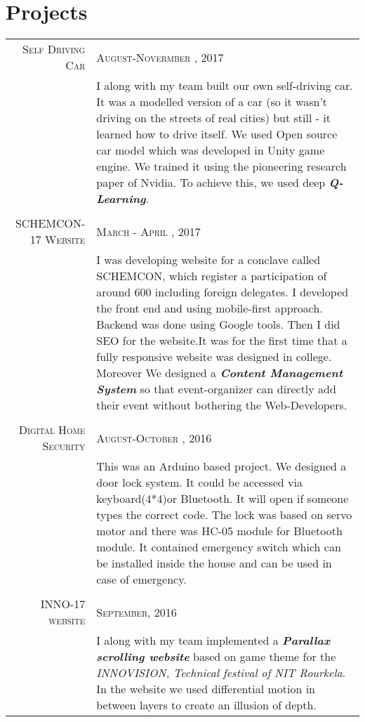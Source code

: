\documentclass[a4paper,10pt]{article}
\begin{document}
\section{Projects}
\begin{tabular}{r|p{11cm}}
\textsc{Self Driving Car}&\textsc{August-Novermber , 2017}\\ &\footnotesize{I along with my team built our own self-driving car. It was a modelled version of a car (so it wasn't driving on the streets of real cities) but still - it learned how to drive itself. We used Open source car model which was developed in Unity game engine. We trained it using the pioneering research paper of Nvidia. To achieve this, we used deep \textit{\textbf{Q-Learning}}.}\\ \\

\textsc{SCHEMCON-17 Website}&\textsc{March - April , 2017}\\ &\footnotesize{I was developing website for a conclave called SCHEMCON, which register a participation
of around 600 including foreign delegates. I developed the front end and using mobile-first approach. Backend was done using Google tools. Then I did SEO for the
website.It was for the first time that a fully responsive website was designed in college. Moreover We designed a \textit{\textbf{Content Management System}} so that event-organizer can directly add their event without bothering the Web-Developers.}\\ \\

\textsc{Digital Home Security}&\textsc{August-October , 2016}\\ &\footnotesize{This was an Arduino based project. We designed a door lock system. It could be accessed via keyboard(4*4)or Bluetooth. It will open if someone types the correct code. The lock was based on servo motor and there was HC-05 module for Bluetooth module. It contained emergency switch which can be installed inside the house and can be used in case of emergency.}\\ \\
\textsc{INNO-17 website}&\textsc{ September, 2016}\\ &\footnotesize{I along with my team implemented a \textit{\textbf{Parallax scrolling website}} based on
game theme for the \textit{INNOVISION, Technical festival of NIT Rourkela}. In the website we used differential motion in between layers to create an illusion of depth. }


\end{tabular}
\end{document}
